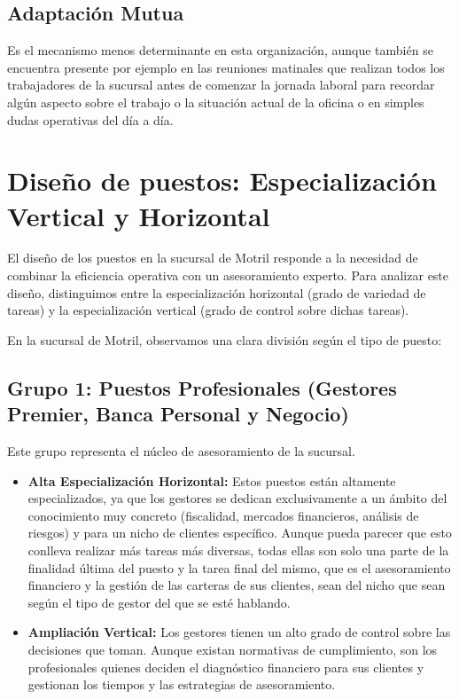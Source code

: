 \subsection{Adaptación Mutua}

Es el mecanismo menos determinante en esta organización, aunque también se encuentra presente por ejemplo en las reuniones matinales que realizan todos los trabajadores de la sucursal antes de comenzar la jornada laboral para recordar algún aspecto sobre el trabajo o la situación actual de la oficina o en simples dudas operativas del día a día. 

\newpage

\section{Diseño de puestos: Especialización Vertical y Horizontal}

El diseño de los puestos en la sucursal de Motril responde a la necesidad de combinar la eficiencia operativa con un asesoramiento experto. Para analizar este diseño, distinguimos entre la especialización horizontal (grado de variedad de tareas) y la especialización vertical (grado de control sobre dichas tareas).

En la sucursal de Motril, observamos una clara división según el tipo de puesto:

\subsection{Grupo 1: Puestos Profesionales (Gestores Premier, Banca Personal y Negocio)}

Este grupo representa el núcleo de asesoramiento de la sucursal.

\begin{itemize}
\item \textbf{Alta Especialización Horizontal:} Estos puestos están altamente especializados, ya que los gestores se dedican exclusivamente a un ámbito del conocimiento muy concreto (fiscalidad, mercados financieros, análisis de riesgos) y para un nicho de clientes específico. Aunque pueda parecer que esto conlleva realizar más tareas más diversas, todas ellas son solo una parte de la finalidad última del puesto y la tarea final del mismo, que es el asesoramiento financiero y la gestión de las carteras de sus clientes, sean del nicho que sean según el tipo de gestor del que se esté hablando.
\item \textbf{Ampliación Vertical:} Los gestores tienen un alto grado de control sobre las decisiones que toman. Aunque existan normativas de cumplimiento, son los profesionales quienes deciden el diagnóstico financiero para sus clientes y gestionan los tiempos y las estrategias de asesoramiento.
\end{itemize}

